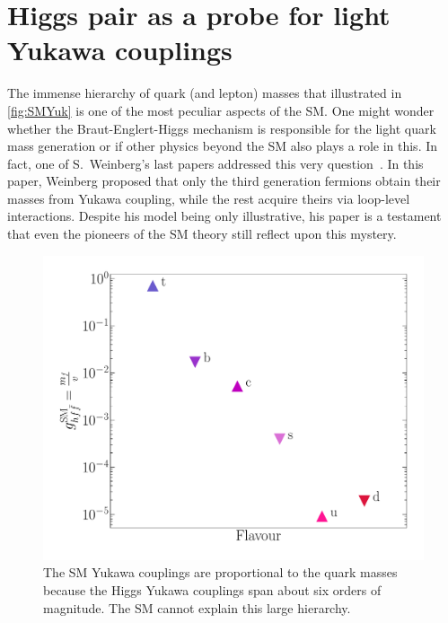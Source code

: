 
\chapter{ Higgs pair as a probe for light Yukawa couplings }\label{chap:lightyuk}
The immense hierarchy of quark (and lepton) masses that illustrated in~ \autoref{fig:SMYuk} is one of the most peculiar aspects of the SM.  One might wonder whether the Braut-Englert-Higgs mechanism is responsible for the light quark mass generation or if other physics  beyond the SM also plays a role in this. In fact, one of S.~Weinberg's last papers addressed this very question~\cite{Weinberg:2020zba}. In this paper, Weinberg proposed that only the third generation fermions obtain their masses from Yukawa coupling, while the rest acquire theirs via loop-level interactions. Despite his model being only illustrative, his paper is a testament that even the pioneers of the SM theory still reflect upon this mystery. \\
\begin{figure}[htpb!]
	\centering
	\includegraphics[width=0.5\linewidth]{./figures/yukawa}
	\caption{The SM Yukawa couplings are proportional to the quark masses because the Higgs Yukawa couplings span about six orders of magnitude. The SM cannot explain this large hierarchy. } 
	\label{fig:SMYuk}
\end{figure}
